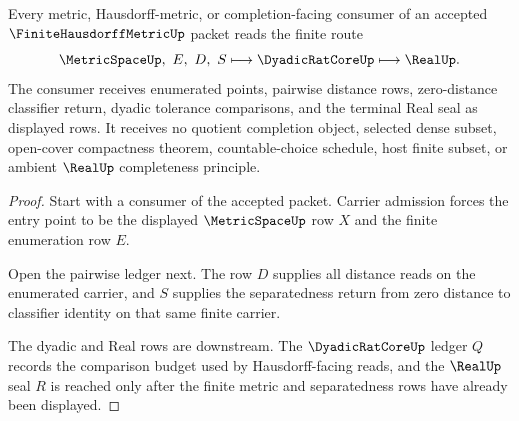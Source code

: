 \begin{theorem}
\label{thm:finite-hausdorff-metric-separated-handoff}
Every metric, Hausdorff-metric, or completion-facing consumer of an accepted $\FiniteHausdorffMetricUp$ packet reads the finite route
$$
\MetricSpaceUp,\ E,\ D,\ S
\longmapsto
\DyadicRatCoreUp
\longmapsto
\RealUp .
$$
The consumer receives enumerated points, pairwise distance rows, zero-distance classifier return, dyadic tolerance comparisons, and the terminal Real seal as displayed rows. It receives no quotient completion object, selected dense subset, open-cover compactness theorem, countable-choice schedule, host finite subset, or ambient $\RealUp$ completeness principle.
\end{theorem}
\begin{proof}
Start with a consumer of the accepted packet. Carrier admission forces the entry point to be the displayed $\MetricSpaceUp$ row $X$ and the finite enumeration row $E$.

Open the pairwise ledger next. The row $D$ supplies all distance reads on the enumerated carrier, and $S$ supplies the separatedness return from zero distance to classifier identity on that same finite carrier.

The dyadic and Real rows are downstream. The $\DyadicRatCoreUp$ ledger $Q$ records the comparison budget used by Hausdorff-facing reads, and the $\RealUp$ seal $R$ is reached only after the finite metric and separatedness rows have already been displayed.
\end{proof}


\begin{closurestatus}{\FiniteHausdorffMetricUp}
  \theoryclosure{\seedClosure}
  \formalstatus{\unformalizedV}
\end{closurestatus}
